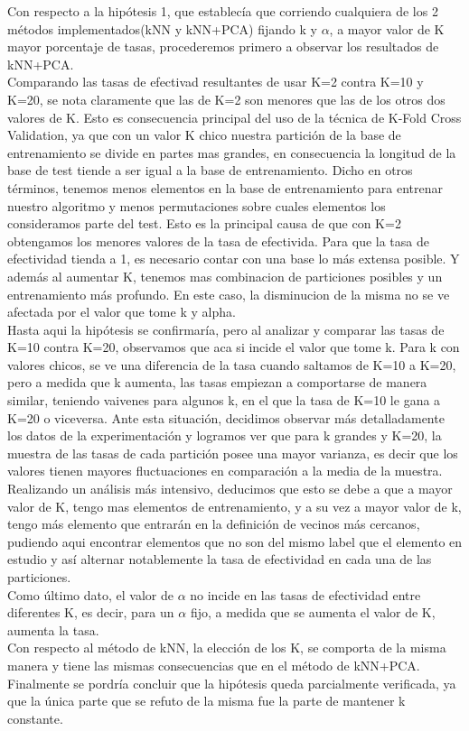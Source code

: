 Con respecto a la hipótesis 1, que establecía que corriendo cualquiera de los 2 métodos implementados(kNN y kNN+PCA) fijando k y $\alpha$, a mayor valor de K mayor porcentaje de tasas, procederemos primero a observar los resultados de kNN+PCA.\\ Comparando las tasas de efectivad resultantes de usar K=2 contra K=10 y K=20, se nota claramente que las de K=2 son menores que las de los otros dos valores de K. Esto es consecuencia principal del uso de la técnica de K-Fold Cross Validation, ya que con un valor K chico nuestra partición de la base de entrenamiento se divide en partes mas grandes, en consecuencia la longitud de la base de test tiende a ser igual a la base de entrenamiento. Dicho en otros términos, tenemos menos elementos en la base de entrenamiento para entrenar nuestro algoritmo y menos permutaciones sobre cuales elementos los consideramos parte del test. Esto es la principal causa de que con K=2 obtengamos los menores valores de la tasa de efectivida. Para que la tasa de efectividad tienda a 1, es necesario contar con una base lo más extensa posible. Y además al aumentar K, tenemos mas combinacion de particiones posibles y un entrenamiento más profundo. En este caso, la disminucion de la misma no se ve afectada por el valor que tome k y alpha. \\Hasta aqui la hipótesis se confirmaría, pero al analizar y comparar las tasas de K=10 contra K=20, observamos que aca si incide el valor que tome k. Para k con valores chicos, se ve una diferencia de la tasa cuando saltamos de K=10 a K=20, pero a medida que k aumenta, las tasas empiezan a comportarse de manera similar, teniendo vaivenes para algunos k, en el que la tasa de K=10 le gana a K=20 o viceversa. Ante esta situación, decidimos observar más detalladamente los datos de la experimentación y logramos ver que para k grandes y K=20, la muestra de las tasas de cada partición posee una mayor varianza, es decir que los valores tienen mayores fluctuaciones en comparación a la media de la muestra. Realizando un análisis más intensivo, deducimos que esto se debe a que a mayor valor de K, tengo mas elementos de entrenamiento, y a su vez a mayor valor de k, tengo más elemento que entrarán en la definición de vecinos más cercanos, pudiendo aqui encontrar elementos que no son del mismo label que el elemento en estudio y así alternar notablemente la tasa de efectividad en cada una de las particiones.\\
Como último dato, el valor de $\alpha$ no incide en las tasas de efectividad entre diferentes K, es decir, para un $\alpha$ fijo, a medida que se aumenta el valor de K, aumenta la tasa.\\
Con respecto al método de kNN, la elección de los K, se comporta de la misma manera y tiene las mismas consecuencias que en el método de kNN+PCA.
Finalmente se pordría concluir que la hipótesis queda parcialmente verificada, ya que la única parte que se refuto de la misma fue la parte de mantener k constante.

